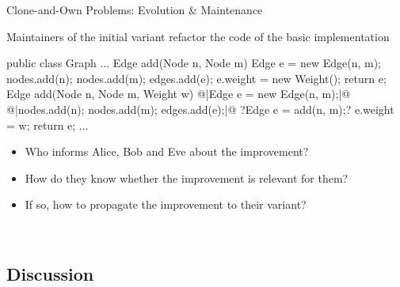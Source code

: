 \begin{frame}[fragile]{Clone-and-Own Problems: Evolution \& Maintenance}
	\begin{mycolumns}[b,widths={43}]
		\begin{example}{}
			Maintainers of the initial variant refactor the code of the basic implementation
		\end{example}
\begin{codetight}{}
public class Graph {
	...
	Edge add(Node n, Node m) {
		Edge e = new Edge(n, m);
		nodes.add(n); nodes.add(m); edges.add(e);
		e.weight = new Weight();
		return e;
	}
	Edge add(Node n, Node m, Weight w) {
		@|Edge e = new Edge(n, m);|@
		@|nodes.add(n); nodes.add(m); edges.add(e);|@
		?Edge e = add(n, m);?
		e.weight = w;
		return e;
	}
	...
}
\end{codetight} %
	\mynextcolumn
		\begin{note}{}
			\begin{itemize}
				\item Who informs Alice, Bob and Eve about the improvement?
				\item How do they know whether the improvement is relevant for them?
				\item If so, how to propagate the improvement to their variant?
			\end{itemize}
		\end{note}

		~

		\hfill
		\hfill
	\end{mycolumns}
\end{frame}

\subsection{Discussion}

